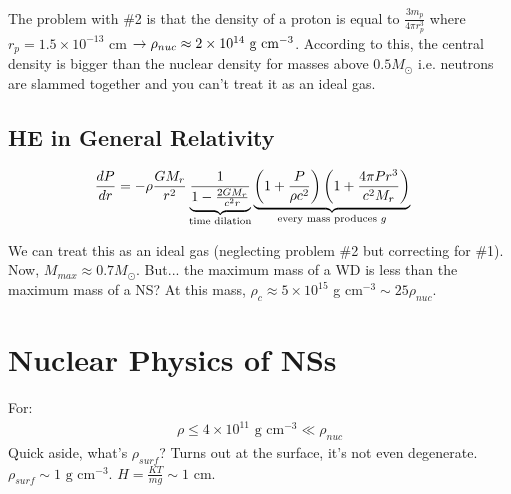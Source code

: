 The problem with \#2 is that the density of a proton is equal to $\frac{3 m_p}{4 \pi r_p^3}$ where $r_p=1.5 \times 10^{-13}$ cm $\rightarrow\rho_{nuc} \approx 2 \times 10^{14} \textrm{ g cm}^{-3}$. According to this, the central density is bigger than the nuclear density for masses above $0.5 M_\odot$ i.e. neutrons are slammed together and you can't treat it as an ideal gas. 

\subsection{HE in General Relativity}
\begin{align}
\frac{dP}{dr} &=-\rho \frac{GM_r}{r^2} \underbrace{ \frac{1}{1-\frac{2GM_r}{c^2r}}}_{\textrm{time dilation}} \underbrace{\left( 1 + \frac{P}{\rho c^2} \right) \left( 1 + \frac{4 \pi Pr^3}{c^2M_r}  \right)}_{\textrm{every mass produces $g$}}
\end{align}

We can treat this as an ideal gas (neglecting problem \#2 but correcting for \#1). Now, $M_{max} \approx 0.7 M_\odot$. But... the maximum mass of a WD is less than the maximum mass of a NS? At this mass, $\rho_c \approx 5 \times 10^{15}$ g cm$^{-3} \sim 25 \rho_{nuc}$. 

\section{Nuclear Physics of NSs}
For:
\begin{align}
\rho \leq 4 \times 10^{11}\textrm{ g cm}^{-3} \ll \rho_{nuc}
\end{align}
Quick aside, what's $\rho_{surf}$? Turns out at the surface, it's not even degenerate. $\rho_{surf} \sim 1 \textrm{ g cm}^{-3}$. $H = \frac{KT}{mg} \sim 1$ cm. \\

